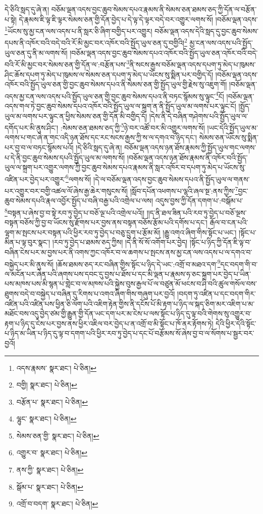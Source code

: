 དེ་ཅིའི་སླད་དུ་ཞེ་ན། བཅོམ་ལྡན་འདས་བྱང་ཆུབ་སེམས་དཔའ་རྣམས་ནི་སེམས་ཅན་ཐམས་ཅད་ཀྱི་དོན་ལ་བརྩོན་པ་སྟེ། དེ་རྣམས་ཇི་ལྟ་ཇི་ལྟར་སེམས་ཅན་གྱི་དོན་བྱེད་པ་དེ་ལྟ་དེ་ལྟར་བདེ་བར་འགྱུར་ལགས་སོ། །བཅོམ་ལྡན་འདས་\footnote{འདས་རྣམས་  སྣར་ཐང་།  པེ་ཅིན། }ཡོངས་སུ་མྱ་ངན་ལས་འདས་པ་ནི་སླར་ཅི་ཞིག་བགྱིད་པར་འགྱུར། བཅོམ་ལྡན་འདས་དེའི་སླད་དུ་བྱང་ཆུབ་སེམས་དཔས་ནི་འཁོར་བའི་བདེ་བའི་རོ་མི་མྱང་བར་འཁོར་བའི་སྤྱོད་ཡུལ་ཅན་དུ་བགྱིའི།\footnote{བགྱི།  སྣར་ཐང་།  པེ་ཅིན། } མྱ་ངན་ལས་འདས་པའི་སྤྱོད་ཡུལ་ཅན་དུ་ནི་མ་ལགས་སོ། །བཅོམ་ལྡན་འདས་བྱང་ཆུབ་སེམས་དཔའ་འཁོར་བའི་སྤྱོད་ཡུལ་ཅན་འཁོར་བའི་བདེ་བའི་རོ་མི་མྱང་བར་སེམས་ཅན་གྱི་དོན་ལ་:བརྩོན་པས་\footnote{བརྩོན་པ་  སྣར་ཐང་།  པེ་ཅིན། }ནི་སངས་རྒྱས་བཅོམ་ལྡན་འདས་དཔག་ཏུ་མེད་པ་ཁུམས་ཤིང་ཆོས་དཔག་ཏུ་མེད་པ་ཁུམས་ལ་སེམས་ཅན་དཔག་ཏུ་མེད་པ་ཡོངས་སུ་སྨིན་པར་བགྱིད་དོ། །བཅོམ་ལྡན་འདས་འཁོར་བའི་སྤྱོད་ཡུལ་ཅན་གྱི་བྱང་ཆུབ་སེམས་དཔའ་ནི་སེམས་ཅན་གྱི་སྤྱོད་ཡུལ་གྱི་རྗེས་སུ་འཇུག་གོ། །བཅོམ་ལྡན་འདས་མྱ་ངན་ལས་འདས་པའི་སྤྱོད་ཡུལ་ཅན་གྱི་བྱང་ཆུབ་སེམས་དཔའ་ནི་བཏང་སྙོམས་སུ་ལྟུང་\footnote{ལྷུང་  སྣར་ཐང་།  པེ་ཅིན། }ངོ། །བཅོམ་ལྡན་འདས་གལ་ཏེ་བྱང་ཆུབ་སེམས་དཔའ་འཁོར་བའི་སྤྱོད་ཡུལ་ལ་སྐྲག་ན་ནི་སྤྱོད་ཡུལ་མ་ལགས་པར་ལྟུང་ངོ། །སྤྱོད་ཡུལ་མ་ལགས་པར་ལྟུང་ན་ཕྱིས་སེམས་ཅན་གྱི་དོན་མི་བགྱིད་དོ། །དེས་ནི་དེ་བཞིན་གཤེགས་པའི་སྤྱོད་ཡུལ་ལ་དགོད་པར་མི་ནུས་ཤིང་། :སེམས་ཅན་ཐམས་ཅད་ཀྱི་\footnote{སེམས་ཅན་གྱི་  སྣར་ཐང་།  པེ་ཅིན། }ཉེ་བར་འཚོ་བར་མི་འགྱུར་ལགས་སོ། །ཡང་དེའི་སྤྱོད་ཡུལ་མ་ལགས་པ་གང་ཞེ་ན་གང་འདི་ཉན་ཐོས་དང་རང་སངས་རྒྱས་ཀྱི་ས་ལ་དགའ་བ་ཉིད་དང་། སེམས་ཅན་ཡོངས་སུ་སྨིན་པར་བྱ་བ་ལ་བཏང་སྙོམས་པའོ། །དེ་ཅིའི་སླད་དུ་ཞེ་ན། བཅོམ་ལྡན་འདས་ཉན་ཐོས་རྣམས་ཀྱི་སྤྱོད་ཡུལ་གང་ལགས་པ་དེ་ནི་བྱང་ཆུབ་སེམས་དཔའི་སྤྱོད་ཡུལ་མ་ལགས་སོ། །བཅོམ་ལྡན་འདས་ཉན་ཐོས་རྣམས་ནི་འཁོར་བའི་སྤྱོད་ཡུལ་ལ་སྐྲག་པར་འགྱུར་ལགས་ཀྱི་བྱང་ཆུབ་སེམས་དཔའ་རྣམས་ནི་སླར་འཁོར་བ་དཔག་ཏུ་མེད་པ་ཡོངས་སུ་འཛིན་པར་བྱེད་པར་འགྱུར་\footnote{འགྱུར་བ་  སྣར་ཐང་།  པེ་ཅིན། }ལགས་སོ། །དེ་ལ་བཅོམ་ལྡན་འདས་བྱང་ཆུབ་སེམས་དཔའ་ནི་སྤྱོད་ཡུལ་ལ་གནས་པར་འགྱུར་བར་བགྱི་འཚལ་ལོ་ཞེས་རྒྱ་ཆེར་གསུངས་སོ། །སློབ་དཔོན་འཕགས་པ་ལྷའི་ཞལ་སྔ་:ནས་ཀྱིས་\footnote{ནས་ཀྱི་  སྣར་ཐང་།  པེ་ཅིན། }བྱང་ཆུབ་སེམས་དཔའི་རྣལ་འབྱོར་སྤྱོད་པ་བཞི་བརྒྱ་པའི་འགྲེལ་པ་ལས། འདུས་བྱས་ཀྱི་དོན་དགག་པ་:བསྒོམ་པ་\footnote{སྒོམ་པ་  སྣར་ཐང་།  པེ་ཅིན། }བསྟན་པ་ཞེས་བྱ་བ་སྟེ་རབ་ཏུ་བྱེད་པ་བཅོ་ལྔ་པའི་འགྲེལ་པའོ།། །།ད་ནི་ཐལ་ཟིན་པའི་རབ་ཏུ་བྱེད་པ་བཅོ་ལྔས་བསྟན་བཅོས་ཀྱི་བྱ་བ་ཡོངས་སུ་རྫོགས་པར་བྱས་ནས་བསྟན་བཅོས་རྩོམ་པའི་དགོས་པ་དང་། རྒོལ་བ་ངན་པའི་ལྷག་མ་སྤངས་པར་བསྟན་པའི་ཕྱིར་རབ་ཏུ་བྱེད་པ་བཅུ་དྲུག་པ་རྩོམ་མོ། །རྒྱུ་འགའ་ཞིག་གིས་སྟོང་པ་ཡང་། །སྟོང་པ་མིན་པ་ལྟ་བུར་སྣང་། །རབ་ཏུ་བྱེད་པ་ཐམས་ཅད་ཀྱིས། །དེ་ནི་སོ་སོ་འགོག་པར་བྱེད། །སྟོང་པ་ཉིད་ཀྱི་དོན་ཇི་ལྟ་བ་བཞིན་ངེས་པར་མ་བྱས་པར་ནི་འགས་ཀྱང་འཁོར་བ་ལ་ཆགས་པ་སྤངས་ནས་མྱ་ངན་ལས་འདས་པ་ལ་དགའ་བ་བསྐྱེད་པར་མི་ནུས་སོ། །ཆོས་ཐམས་ཅད་རང་བཞིན་གྱིས་སྟོང་པ་ཉིད་དེ་ཡང་:འགྲོ་བ་མཐའ་དག་\footnote{འགྲོ་བ་བདག་  སྣར་ཐང་།  པེ་ཅིན། }དང་བདག་གི་བ་ལ་མངོན་པར་ཞེན་པའི་ཞགས་པས་དབང་དུ་བྱས་པ་ཐོས་པ་དང་མི་ལྡན་པ་རྣམས་ཧ་ཅང་སྐྲག་པར་བྱེད་པ་ཡིན་པས་མཁས་པས་མི་སྙན་པ་གླེང་བ་ལ་མཁས་པའི་སྐྱེས་བུས་རྒྱལ་པོ་ལ་བཙུན་མོ་ཕངས་བ་ཤི་བའི་ཚུལ་གསོལ་བས་ཐུགས་བདེ་བ་བསྐྱེད་པ་བཞིན་དུ་རིགས་པ་འགའ་ཞིག་གིས་གཞུག་པར་བྱའོ། །བདག་ཏུ་འཛིན་པ་དང་བདག་གིར་འཛིན་པའི་འཛིན་པས་ཕྱིན་ཅི་ལོག་པའི་འཇིག་རྟེན་གྱིས་ནི་དངོས་པོ་མི་རྟག་པ་ཉིད་ལ་སྐད་ཅིག་མར་འཇིག་པ་མ་མཐོང་བས་འདུ་བྱེད་ཙམ་གྱི་རྒྱུན་གྱི་དོན་ཡང་དག་པར་མ་ངེས་པ་ལས་སྟོང་པ་ཉིད་དུ་ལྟ་བའི་གེགས་སུ་འགྱུར་བ་རྟག་པ་ཉིད་དུ་ངེས་པར་བྱས་ནས་ཕྱིར་འཇིལ་བར་བྱེད་པ་ན་འགྲོ་བ་མི་སྟོང་པ་ཁོ་ནར་རྟོགས་ཏེ། དེའི་ཕྱིར་དེའི་སྟོང་པ་ཉིད་མ་ཡིན་པ་ཉིད་དུ་ལྟ་བ་དགག་པའི་ཕྱིར་རབ་ཏུ་བྱེད་པ་དང་པོ་བརྩོམས་སོ་ཞེས་བྱ་བ་ལ་སོགས་པ་སྦྱར་བར་བྱའོ། 